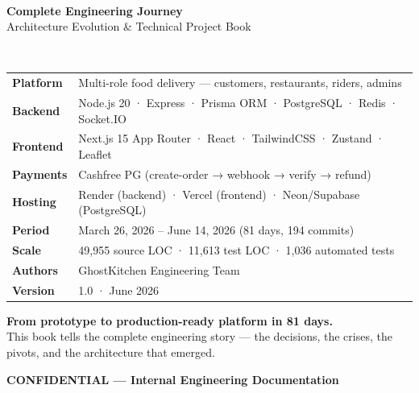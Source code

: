 \documentclass[11pt,a4paper,twoside]{book}
\begin{document}

\frontmatter

\begin{titlepage}
  \centering
  \vspace*{2cm}
  \\[0.6cm]
  {\LARGE\bfseries\color{dark} Complete Engineering Journey}\\[0.3cm]
  {\large\color{muted} Architecture Evolution \& Technical Project Book}\\[0.2cm]
  \\[2.5cm]

  \begin{tabular}{p{4cm}p{9cm}}
    \textbf{Platform}     & Multi-role food delivery — customers, restaurants, riders, admins \\[4pt]
    \textbf{Backend}      & Node.js 20 · Express · Prisma ORM · PostgreSQL · Redis · Socket.IO \\[4pt]
    \textbf{Frontend}     & Next.js 15 App Router · React · TailwindCSS · Zustand · Leaflet \\[4pt]
    \textbf{Payments}     & Cashfree PG (create-order → webhook → verify → refund) \\[4pt]
    \textbf{Hosting}      & Render (backend) · Vercel (frontend) · Neon/Supabase (PostgreSQL) \\[4pt]
    \textbf{Period}       & March 26, 2026 – June 14, 2026 (81 days, 194 commits) \\[4pt]
    \textbf{Scale}        & 49,955 source LOC · 11,613 test LOC · 1,036 automated tests \\[4pt]
    \textbf{Authors}      & GhostKitchen Engineering Team \\[4pt]
    \textbf{Version}      & 1.0 · June 2026 \\
  \end{tabular}

  \vfill
  \begin{tcolorbox}[colback=brand!6,colframe=brand,width=\textwidth]
  \centering
  \textbf{From prototype to production-ready platform in 81 days.}\\
  This book tells the complete engineering story — the decisions, the crises,
  the pivots, and the architecture that emerged.
  \end{tcolorbox}
  \vspace{0.5cm}
  {\small\color{muted}\textbf{CONFIDENTIAL — Internal Engineering Documentation}}
\end{titlepage}
\end{document}
